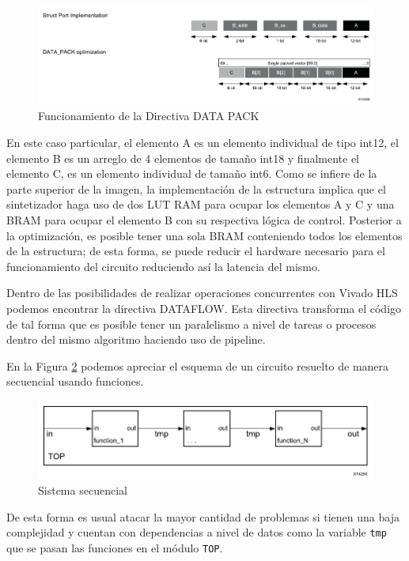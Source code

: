 \begin{figure}[H]
	\centering
		\includegraphics[scale=0.8]{./Figures/HLS13.pdf}
	\caption{Funcionamiento de la Directiva DATA PACK \citep{HLS2015}}
	\label{fig:HLS13}
\end{figure}

En este caso particular, el elemento A es un elemento individual de tipo int12, el elemento B es un arreglo de 4 elementos de tamaño int18 y finalmente el elemento C, es un elemento individual de tamaño int6. Como se infiere de la parte superior de la imagen, la implementación de la estructura implica que el sintetizador haga uso de dos LUT RAM para ocupar los elementos A y C y una BRAM para ocupar el elemento B con su respectiva lógica de control. Posterior a la optimización, es posible tener una sola BRAM conteniendo todos los elementos de la estructura; de esta forma, se puede reducir el hardware necesario para el funcionamiento del circuito reduciendo así la latencia del mismo.

Dentro de las posibilidades de realizar operaciones concurrentes con Vivado HLS podemos encontrar la directiva DATAFLOW. Esta directiva transforma el código de tal forma que es posible tener un paralelismo a nivel de tareas o procesos dentro del mismo algoritmo haciendo uso de pipeline.

En la Figura \ref{fig:HLS14} podemos apreciar el esquema de un circuito resuelto de manera secuencial usando funciones.

\begin{figure}[H]
  \centering
    \includegraphics[scale=0.8]{./Figures/HLS14.pdf}
  \caption{Sistema secuencial  \citep{HLS2015}}
  \label{fig:HLS14}
\end{figure}

De esta forma es usual atacar la mayor cantidad de problemas si tienen una baja complejidad y cuentan con dependencias a nivel de datos como la variable \texttt{tmp} que se pasan las funciones en el módulo \texttt{TOP}.

